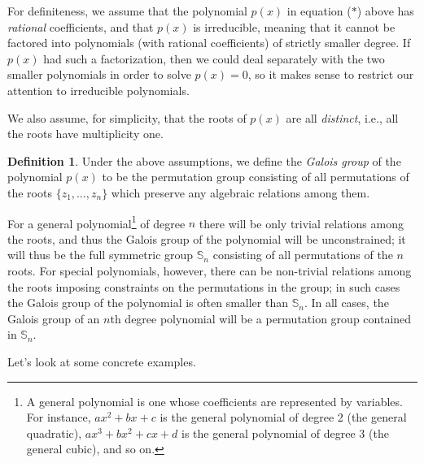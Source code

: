 \documentclass[11pt]{article}
\theoremstyle{definition}
\newtheorem{defn}[thm]{Definition}
\newcommand{\Sym}{\mathbb{S}}
\begin{document}
For definiteness, we assume that the polynomial $p(x)$ in equation
($*$) above has \emph{rational} coefficients, and that $p(x)$ is
irreducible, meaning that it cannot be factored into polynomials (with
rational coefficients) of strictly smaller degree. If $p(x)$ had such
a factorization, then we could deal separately with the two smaller
polynomials in order to solve $p(x) = 0$, so it makes sense to
restrict our attention to irreducible polynomials. 

We also assume, for simplicity, that the roots of $p(x)$ are all
\emph{distinct}, i.e., all the roots have multiplicity one.

\begin{defn}
Under the above assumptions, we define the {\em Galois
  group} of the polynomial $p(x)$ to be the
permutation group consisting of all permutations of the roots $\{z_1,
\dots, z_n\}$ which preserve any algebraic relations among them.
\end{defn}



For a general polynomial\footnote{A general polynomial is one whose
  coefficients are represented by variables. For instance, $ax^2 + bx
  + c$ is the general polynomial of degree 2 (the general quadratic),
  $ax^3+bx^2+cx+d$ is the general polynomial of degree $3$ (the
  general cubic), and so on.} of degree $n$ there will be only trivial
relations among the roots, and thus the Galois group of the polynomial
will be unconstrained; it will thus be the full symmetric group
$\Sym_n$ consisting of all permutations of the $n$ roots. For special
polynomials, however, there can be non-trivial relations among the
roots imposing constraints on the permutations in the group; in such
cases the Galois group of the polynomial is often smaller than
$\Sym_n$. In all cases, the Galois group of an $n$th degree polynomial
will be a permutation group contained in $\Sym_n$.

Let's look at some concrete examples.
\end{document}
